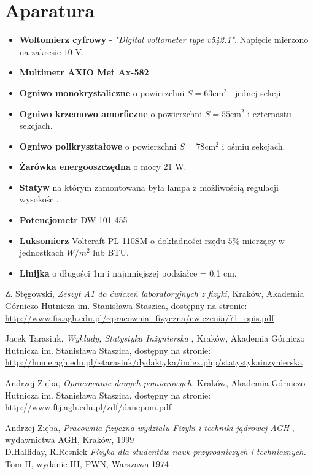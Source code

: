 \documentclass{article}
\begin{document}
\section{Aparatura}
\begin{itemize}
	\item \textbf{Woltomierz cyfrowy} - \textit{"Digital voltometer type v542.1"}. Napięcie mierzono na zakresie $10$ V. %
	\item \textbf{Multimetr AXIO Met Ax-582}
	\item \textbf{Ogniwo monokrystaliczne} o powierzchni $S=63 \text{cm}^2$ i jednej sekcji.
	\item \textbf{Ogniwo krzemowo amorficzne} o powierzchni $S=55 \text{cm}^2$ i czternastu sekcjach.
	\item \textbf{Ogniwo polikryształowe} o powierzchni $S=78 \text{cm}^2$ i ośmiu sekcjach.
	\item \textbf{Żarówka energooszczędna} o mocy 21 W.
	\item \textbf{Statyw} na którym zamontowana była lampa z możliwością regulacji wysokości.
	\item \textbf{Potencjometr} DW 101 455
	\item \textbf{Luksomierz} Voltcraft PL-110SM o dokładności rzędu $5\%$ mierzący w jednostkach $W/m^2$ lub BTU.
	\item \textbf{Linijka} o długości 1m i najmniejszej podziałce = 0,1 cm.
\end{itemize}


\newpage

\begin{thebibliography}{9}
	
	Z. Stęgowski,
	\emph{Zeszyt A1 do ćwiczeń laboratoryjnych z fizyki}, Kraków, Akademia Górniczo Hutnicza im. Stanisława Staszica, dostępny na stronie:\\
	\url{http://www.fis.agh.edu.pl/\~pracownia\_fizyczna/cwiczenia/71\_opis.pdf}
	
	
	
	\bibitem[2]{}
	Jacek Tarasiuk,
	\emph{Wykłady, Statystyka Inżynierska} , Kraków, Akademia Górniczo Hutnicza im. Stanisława Staszica, dostępny na stronie:\\
	\url{http://home.agh.edu.pl/~tarasiuk/dydaktyka/index.php/statystykainzynierska}
	
	Andrzej Zięba,
	\emph{Opracowanie danych pomiarowych}, Kraków, Akademia Górniczo Hutnicza im. Stanisława Staszica, dostępny na stronie:\\
	\url{http://www.ftj.agh.edu.pl/zdf/danepom.pdf}
	\label{statystyka}
	
	Andrzej Zięba,
	\emph{Pracownia fizyczna wydziału Fizyki i techniki jądrowej AGH} , wydawnictwa AGH, Kraków, 1999\\
	
	
	D.Halliday, R.Resnick
	\emph{Fizyka dla studentów nauk przyrodniczych i technicznych.} Tom II, wydanie III, PWN, Warszawa 1974
	
\end{thebibliography}
\end{document}

